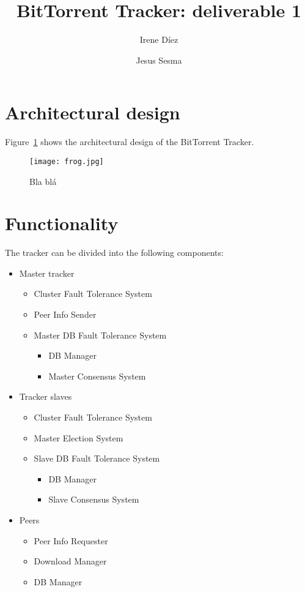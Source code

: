 \documentclass[twoside,a4paper,10pt]{article}
\title{BitTorrent Tracker: deliverable 1}
\author{Irene Díez \and Jesus Sesma}
\begin{document}
\date{}
\maketitle


\section{Architectural design}

Figure~\ref{fig:arch} shows the architectural design of the BitTorrent Tracker.

\begin{figure}[h]
  \centering
  \texttt{[image: frog.jpg]}
  \caption{\label{fig:arch}Bla blá}
\end{figure}

\section{Functionality}

The tracker can be divided into the following components:
\begin{itemize}
\item Master tracker
  \begin{itemize}
  \item Cluster Fault Tolerance System
  \item Peer Info Sender
  \item Master DB Fault Tolerance System
    \begin{itemize}
    \item DB Manager
    \item Master Consensus System
    \end{itemize}
  \end{itemize}
\item Tracker slaves
  \begin{itemize}
  \item Cluster Fault Tolerance System
  \item Master Election System
  \item Slave DB Fault Tolerance System
    \begin{itemize}
    \item DB Manager
    \item Slave Consensus System
    \end{itemize}
  \end{itemize}
\item Peers
  \begin{itemize}
  \item Peer Info Requester
  \item Download Manager
  \item DB Manager
  \end{itemize}
\end{itemize}
\end{document}
